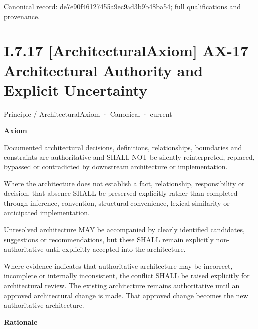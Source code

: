 {\footnotesize \href{../../../../../../../continuum/motivation/principle/de7e90f46127455a9ec9ad3b9b48ba54.md}{Canonical record: de7e90f46127455a9ec9ad3b9b48ba54}; full qualifications and provenance.}\par
\section*{I.7.17 [ArchitecturalAxiom] AX-17 Architectural Authority and Explicit Uncertainty}
\label{navigation:I.7.17}

\label{element:8882573df7ce43c6bc0f66da0a676139}
{\small Principle / ArchitecturalAxiom · Canonical · current}\par

\par\medskip\textbf{Axiom}\par


Documented architectural decisions, definitions, relationships, boundaries
and constraints are authoritative and SHALL NOT be silently reinterpreted,
replaced, bypassed or contradicted by downstream architecture or
implementation.



Where the architecture does not establish a fact, relationship,
responsibility or decision, that absence SHALL be preserved explicitly
rather than completed through inference, convention, structural
convenience, lexical similarity or anticipated implementation.



Unresolved architecture MAY be accompanied by clearly identified
candidates, suggestions or recommendations, but these SHALL remain
explicitly non-authoritative until explicitly accepted into the
architecture.



Where evidence indicates that authoritative architecture may be incorrect,
incomplete or internally inconsistent, the conflict SHALL be raised
explicitly for architectural review. The existing architecture remains
authoritative until an approved architectural change is made. That
approved change becomes the new authoritative architecture.



\par\medskip\textbf{Rationale}\par


